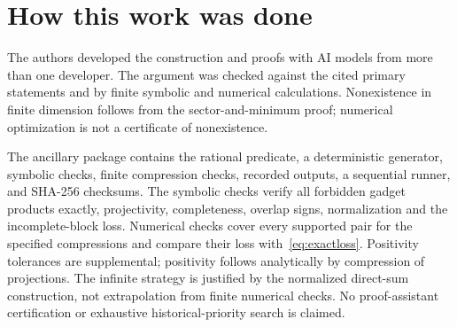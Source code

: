 \documentclass[11pt]{article}
\theoremstyle{definition}
\begin{document}
\section*{How this work was done}
The authors developed the construction and proofs with AI models from more than one developer. The argument was checked against the cited primary statements and by finite symbolic and numerical calculations. Nonexistence in finite dimension follows from the sector-and-minimum proof; numerical optimization is not a certificate of nonexistence.

The ancillary package contains the rational predicate, a deterministic generator, symbolic checks, finite compression checks, recorded outputs, a sequential runner, and SHA-256 checksums. The symbolic checks verify all forbidden gadget products exactly, projectivity, completeness, overlap signs, normalization and the incomplete-block loss. Numerical checks cover every supported pair for the specified compressions and compare their loss with~\eqref{eq:exactloss}. Positivity tolerances are supplemental; positivity follows analytically by compression of projections. The infinite strategy is justified by the normalized direct-sum construction, not extrapolation from finite numerical checks. No proof-assistant certification or exhaustive historical-priority search is claimed.



\end{document}
